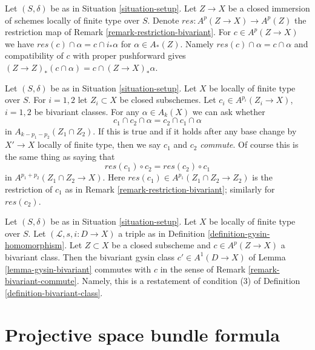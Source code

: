 \begin{remark}
\label{remark-res-push}
Let $(S, \delta)$ be as in Situation \ref{situation-setup}.
Let $Z \to X$ be a closed immersion of schemes locally of
finite type over $S$. Denote $res : A^p(Z \to X) \to A^p(Z)$
the restriction map of Remark \ref{remark-restriction-bivariant}.
For $c \in A^p(Z \to X)$ we have
$res(c) \cap \alpha = c \cap i_*\alpha$ for $\alpha \in A_*(Z)$.
Namely $res(c) \cap \alpha = c \cap \alpha$
and compatibility of $c$ with proper pushforward
gives $(Z \to Z)_*(c \cap \alpha) = c \cap (Z \to X)_*\alpha$.
\end{remark}

\begin{remark}
\label{remark-bivariant-commute}
Let $(S, \delta)$ be as in Situation \ref{situation-setup}. Let $X$ be
locally of finite type over $S$. For $i = 1, 2$ let
$Z_i \subset X$ be closed subschemes. Let $c_i \in A^{p_i}(Z_i \to X)$,
$i = 1, 2$ be bivariant classes. For any $\alpha \in A_k(X)$
we can ask whether
$$
c_1 \cap c_2 \cap \alpha = c_2 \cap c_1 \cap \alpha
$$
in $A_{k - p_1 - p_2}(Z_1 \cap Z_2)$. If this is true and if it holds
after any base change by $X' \to X$ locally of finite type, then we say
$c_1$ and $c_2$ {\it commute}. Of course this is the same thing as saying that
$$
res(c_1) \circ c_2 = res(c_2) \circ c_1
$$
in $A^{p_1 + p_2}(Z_1 \cap Z_2 \to X)$. Here
$res(c_1) \in A^{p_1}(Z_1 \cap Z_2 \to Z_2)$ is the restriction of $c_1$
as in Remark \ref{remark-restriction-bivariant}; similarly for $res(c_2)$.
\end{remark}

\begin{example}
\label{example-gysin-commute}
Let $(S, \delta)$ be as in Situation \ref{situation-setup}. Let $X$ be locally
of finite type over $S$. Let $(\mathcal{L}, s, i : D \to X)$ a triple as in
Definition \ref{definition-gysin-homomorphism}. Let $Z \subset X$ be a closed
subscheme and $c \in A^p(Z \to X)$ a bivariant class. Then the
bivariant gysin class $c' \in A^1(D \to X)$ of
Lemma \ref{lemma-gysin-bivariant} commutes with $c$ in the sense of
Remark \ref{remark-bivariant-commute}. Namely, this is a restatement of
condition (3) of Definition \ref{definition-bivariant-class}.
\end{example}





\section{Projective space bundle formula}
\label{section-projective-space-bundle-formula}

